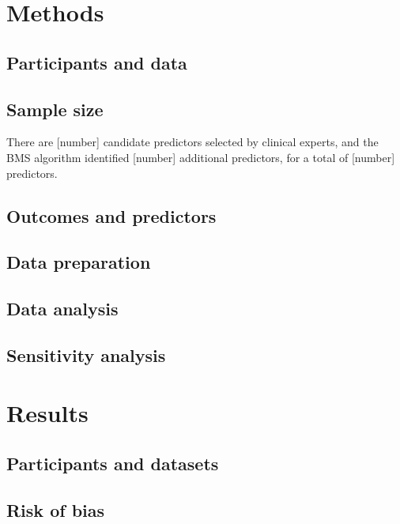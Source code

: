 \documentclass[
  letterpaper,
  DIV=11,
  numbers=noendperiod]{scrartcl}
\begin{document}
\section{Methods}\label{methods}

\subsection{Participants and data}\label{participants-and-data}

\subsection{Sample size}\label{sample-size}

There are {[}number{]} candidate predictors selected by clinical
experts, and the BMS algorithm identified {[}number{]} additional
predictors, for a total of {[}number{]} predictors.

\subsection{Outcomes and predictors}\label{outcomes-and-predictors}

\subsection{Data preparation}\label{data-preparation}

\subsection{Data analysis}\label{data-analysis}

\subsection{Sensitivity analysis}\label{sensitivity-analysis}

\section{Results}\label{results}

\subsection{Participants and datasets}\label{participants-and-datasets}

\subsection{Risk of bias}\label{risk-of-bias}
\end{document}

